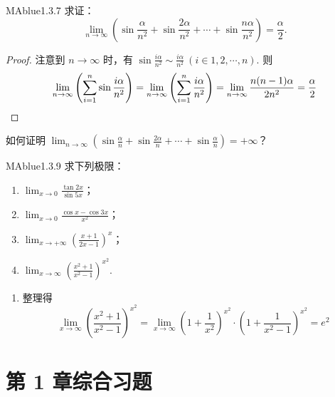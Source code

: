 \begin{problem}{MAblue}{1.3.7}
    求证：
    \[
        \lim_{n \to \infty} \left( \sin \frac \alpha {n^2} + \sin \frac{2\alpha}{n^2} + \cdots + \sin \frac{n\alpha}{n^2} \right) = \frac \alpha 2.
    \]
\end{problem}

\begin{proof}
    注意到 $n \to \infty$ 时，有 $\sin \frac{i\alpha}{n^2} \sim \frac{i\alpha}{n^2} \ (i \in {1, 2, \cdots, n})$. 则
    \[
        \lim_{n \to \infty} \left( \sum_{i=1}^n \sin \frac{i\alpha}{n^2} \right) = \lim_{n \to \infty} \left( \sum_{i=1}^n \frac{i\alpha}{n^2} \right) = \lim_{n \to \infty} \frac{n(n-1)\alpha}{2n^2} = \frac \alpha 2 \qedhere
    \]
\end{proof}

\begin{think}
    如何证明 $\lim_{n \to \infty} \left( \sin \frac \alpha n + \sin \frac {2\alpha} n + \cdots + \sin \frac \alpha n \right) = +\infty$？
\end{think}

\begin{problem}{MAblue}{1.3.9}
    求下列极限：
    \begin{enumerate}
        \item[(1)]
        $\displaystyle \lim_{x \to 0} \frac{\tan 2x}{\sin 5x}$；
        \item[(2)]
        $\displaystyle \lim_{x \to 0} \frac{\cos x - \cos 3x}{x^2}$；
        \item[(3)]
        $\displaystyle \lim_{x \to +\infty} \left( \frac{x+1}{2x-1} \right)^x$；
        \item[(4)]
        $\displaystyle \lim_{x \to \infty} \left( \frac{x^2+1}{x^2-1} \right)^{x^2}$.
    \end{enumerate}
\end{problem}

\begin{enumerate}
    \item[(4)]
    \begin{solution}
        \vspace{0.15em}
        整理得
        \[
            \lim_{x \to \infty} \left(\frac{x^2+1}{x^2-1}\right)^{x^2} = \lim_{x \to \infty} \left(1+\frac 1 {x^2}\right)^{x^2} \cdot \left(1+\frac 1 {x^2-1}\right)^{x^2} = e^2
        \]
    \end{solution}
\end{enumerate}

\section*{第 1 章综合习题}

